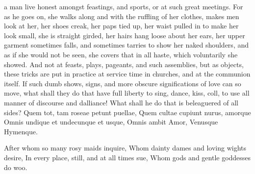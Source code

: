 a man live honest amongst feastings, and sports, or at such great
meetings. For as he goes on, she walks along and with the
ruffling of her clothes, makes men look at her, her shoes creak, her
paps tied up, her waist pulled in to make her look small, she is
straight girded, her hairs hang loose about her ears, her upper garment
sometimes falls, and sometimes tarries to show her naked shoulders, and
as if she would not be seen, she covers that in all haste, which
voluntarily she showed. And not at feasts, plays, pageants, and such
assemblies, but as \Chrysostom objects, these tricks are put in
practice at service time in churches, and at the communion itself. If
such dumb shows, signs, and more obscure significations of love can so
move, what shall they do that have full liberty to sing, dance, kiss,
coll, to use all manner of discourse and dalliance! What shall he do
that is beleaguered of all sides?
Quem tot, tam roseae petunt puellae,
Quem cultae cupiunt nurus, amorque
Omnis undique et undecunque et usque,
Omnis ambit Amor, Venusque Hymenque.

After whom so many rosy maids inquire,
Whom dainty dames and loving wights desire,
In every place, still, and at all times sue,
Whom gods and gentle goddesses do woo.

